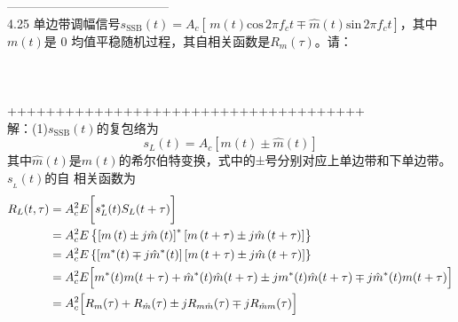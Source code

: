 \documentclass[utf8]{article}
\begin{document}
---------------------------------------\\
4.25 单边带调幅信号$s_{\mathrm{SSB}}\left(t\right)=A_{c}\left[\,m\left(t\right)\mathrm{cos}\,2\pi f_{c}t\mp\hat{m}\left(t\right)\mathrm{sin}\,2\pi f_{c}t\right]$，其中$m\left(t\right)$是 0 均值平稳随机过程，其自相关函数是$R_{m}\left(\tau\right)$。请：\\
\indent{}\\
\indent{}\\
\indent{}\\
+++++++++++++++++++++++++++++++++++++\\
解：(1)$s_{\mathrm{SSB}}\left(t\right)$的复包络为
$$s_{L}\left(t\right)=A_{c}\left[m\left(t\right)\pm\hat{m}\left(t\right)\right]$$
其中${\hat{m}}\left(t\right)$是$m\left(t\right)$的希尔伯特变换，式中的±号分别对应上单边带和下单边带。$s_{_{L}}\left(t\right)$的自
相关函数为
\begin{align*}
R_{L}(t, \tau) &= A_c^2 E\biggl[ s_L^*(t) S_L(t+\tau) \biggr] \\
&= A_c^2 E\left\{\left[m\left(t\right) \pm j\hat{m}\left(t\right)\right]^* \left[m\left(t+\tau\right) \pm j\hat{m}\left(t+\tau\right)\right]\right\} \\
&= A_c^2 E\left\{\left[m^*(t) \mp j\hat{m}^*(t)\right] \left[m\left(t+\tau\right) \pm j\hat{m}\left(t+\tau\right)\right]\right\} \\
&= A_c^2 E\Bigl[ m^*(t) m(t+\tau) + \hat{m}^*(t)\hat{m}(t+\tau) \pm j m^*(t)\hat{m}(t+\tau) \mp j \hat{m}^*(t) m(t+\tau) \Bigr] \\
&= A_c^2 \Bigl[ R_m(\tau) + R_{\hat{m}}(\tau) \pm j R_{m\hat{m}}(\tau) \mp j R_{\hat{m}m}(\tau) \Bigr] 
\end{align*}
\end{document}
